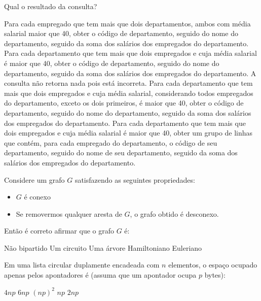 \documentclass[12pt, addpoints]{exam}
\begin{document}
\begin{questions}
\begin{verbatim}
\end{verbatim}



Qual o resultado da consulta?
\begin{choices}
\choice Para cada empregado que tem mais que dois departamentos, ambos com média salarial maior que 40, obter o código de departamento, seguido do nome do departamento, seguido da soma dos salários dos empregados do departamento.
\choice Para cada departamento que tem mais que dois empregados e cuja média salarial é maior que 40, obter o código de departamento, seguido do nome do departamento, seguido da soma dos salários dos empregados do departamento.
\choice A consulta não retorna nada pois está incorreta.
\choice Para cada departamento que tem mais que dois empregados e cuja média salarial, considerando todos empregados do departamento, exceto os dois primeiros, é maior que 40, obter o código de departamento, seguido do nome do departamento, seguido da soma dos salários dos empregados do departamento.
\choice Para cada departamento que tem mais que dois empregados e cuja média salarial é maior que 40, obter um grupo de linhas que contém, para cada empregado do departamento, o código de seu departamento, seguido do nome de seu departamento, seguido da soma dos salários dos empregados do departamento.
\end{choices}

\question

Considere um grafo \( G \) satisfazendo as seguintes propriedades:



\begin{itemize}

    \item \( G \) é conexo

    \item Se removermos qualquer aresta de \( G \), o grafo obtido é desconexo.

\end{itemize}



Então é correto afirmar que o grafo \( G \) é:
\begin{choices}
\choice Não bipartido
\choice Um circuito
\choice Uma árvore
\choice Hamiltoniano
\choice Euleriano
\end{choices}

\question

Em uma lista circular duplamente encadeada com \( n \) elementos, o espaço ocupado apenas pelos apontadores é (assuma que um apontador ocupa \( p \) bytes):
\begin{choices}
\choice \( 4np \)
\choice \( 6np \)
\choice \( (np)^2 \)
\choice \( np \)
\choice \( 2np \)
\end{choices}


\end{questions}
\end{document}
